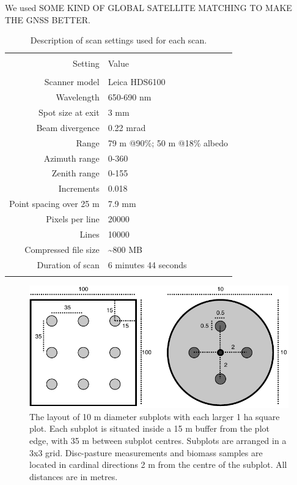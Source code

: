 \documentclass[11pt,a4paper]{article}
\begin{document}
We used SOME KIND OF GLOBAL SATELLITE MATCHING TO MAKE THE GNSS BETTER.

\begin{table}[H] \centering 
  \caption{Description of scan settings used for each scan.} 
  \label{scan_settings} 
\begin{tabular}{@{\extracolsep{0pt}} rl} 
\\[-1.8ex]\hline 
\hline \\[-1.8ex] 
{Setting} & {Value} \\
\hline \\[-1.8ex] 
Scanner model & Leica HDS6100 \\
Wavelength & 650-690 nm \\
Spot size at exit & 3 mm \\
Beam divergence & 0.22 mrad \\
Range & 79 m @90\%; 50 m @18\% albedo \\
Azimuth range & 0-360\textdegree{} \\
Zenith range & 0-155\textdegree{} \\
Increments & 0.018\textdegree{} \\
Point spacing over 25 m & 7.9 mm \\
Pixels per line & 20000 \\
Lines & 10000 \\
Compressed file size & \textasciitilde{}800 MB \\
Duration of scan & 6 minutes 44 seconds \\
\hline
\hline \\[-1.8ex] 
\end{tabular} 
\end{table} 

\begin{figure}[H]
\centering
	\includegraphics[width=\textwidth]{subplot}
	\caption{The layout of 10 m diameter subplots with each larger 1 ha square plot. Each subplot is situated inside a 15 m buffer from the plot edge, with 35 m between subplot centres. Subplots are arranged in a 3x3 grid. Disc-pasture measurements and biomass samples are located in cardinal directions 2 m from the centre of the subplot. All distances are in metres.}
	\label{subplot}
\end{figure}
\end{document}
